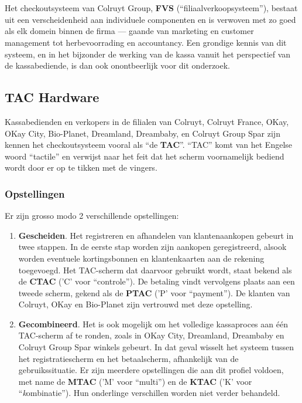 
\chapter{}
\label{ch:functionele-omschrijving}

Het checkoutsysteem van Colruyt Group, \textbf{FVS} (``filiaalverkoopsysteem''), bestaat uit een verscheidenheid aan individuele componenten en is verwoven met zo goed als elk domein binnen de firma — gaande van marketing en customer management tot herbevoorrading en accountancy. Een grondige kennis van dit systeem, en in het bijzonder de werking van de kassa vanuit het perspectief van de kassabediende, is dan ook onontbeerlijk voor dit onderzoek.

\section{TAC Hardware}

Kassabedienden en verkopers in de filialen van Colruyt, Colruyt France, OKay, OKay City, Bio-Planet, Dreamland, Dreambaby, en Colruyt Group Spar zijn kennen het checkoutsysteem vooral als ``de \textbf{TAC}''. ``TAC'' komt van het Engelse woord ``tactile'' en verwijst naar het feit dat het scherm voornamelijk bediend wordt door er op te tikken met de vingers.

\subsection{Opstellingen}

Er zijn grosso modo 2 verschillende opstellingen:

\begin{enumerate}
     \item \textbf{Gescheiden}. Het registreren en afhandelen van klantenaankopen gebeurt in twee stappen. In de eerste stap worden zijn aankopen geregistreerd, alsook worden eventuele kortingsbonnen en klantenkaarten aan de rekening toegevoegd. Het TAC-scherm dat daarvoor gebruikt wordt, staat bekend als de \textbf{CTAC} ('C' voor ``controle''). De betaling vindt vervolgens plaats aan een tweede scherm, gekend als de \textbf{PTAC} ('P' voor ``payment''). De klanten van Colruyt, OKay en Bio-Planet zijn vertrouwd met deze opstelling.
     \item \textbf{Gecombineerd}. Het is ook mogelijk om het volledige kassaproces aan één TAC-scherm af te ronden, zoals in OKay City, Dreamland, Dreambaby en Colruyt Group Spar winkels gebeurt. In dat geval wisselt het systeem tussen het registratiescherm en het betaalscherm, afhankelijk van de gebruikssituatie. Er zijn meerdere opstellingen die aan dit profiel voldoen, met name de \textbf{MTAC} ('M' voor ``multi'') en de \textbf{KTAC} ('K' voor ``\emph{k}ombinatie''). Hun onderlinge verschillen worden niet verder behandeld.
\end{enumerate}

